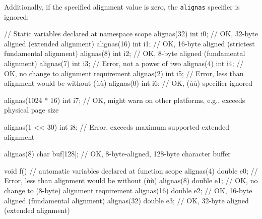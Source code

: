 \noindent Additionally, if the specified alignment value is zero, the
\lstinline!alignas! specifier is ignored:

%
%
%
%
\begin{emcppslisting}[label=fnref]
// Static variables declared at namespace scope
alignas(32) int i0; // OK, 32-byte aligned (extended alignment)
alignas(16) int i1; // OK, 16-byte aligned (strictest fundamental alignment)
alignas(8)  int i2; // OK,  8-byte aligned (fundamental alignment)
alignas(7)  int i3; // Error, not a power of two
alignas(4)  int i4; // OK, no change to alignment requirement
alignas(2)  int i5; // Error, less than alignment would be without (ù{}ù)
alignas(0)  int i6; // OK, (ù{}ù) specifier ignored

alignas(1024 * 16) int i7;
    // OK, might warn on other platforms, e.g., exceeds physical page size

alignas(1 << 30) int i8;
    // Error, exceeds maximum supported extended alignment

alignas(8) char buf[128]; // OK, 8-byte-aligned, 128-byte character buffer

void f()
{
  // automatic variables declared at function scope
  alignas(4)  double e0; // Error, less than alignment would be without (ù{}ù)
  alignas(8)  double e1; // OK, no change to (8-byte) alignment requirement
  alignas(16) double e2; // OK, 16-byte aligned (fundamental alignment)
  alignas(32) double e3; // OK, 32-byte aligned (extended alignment)
}
\end{emcppslisting}



